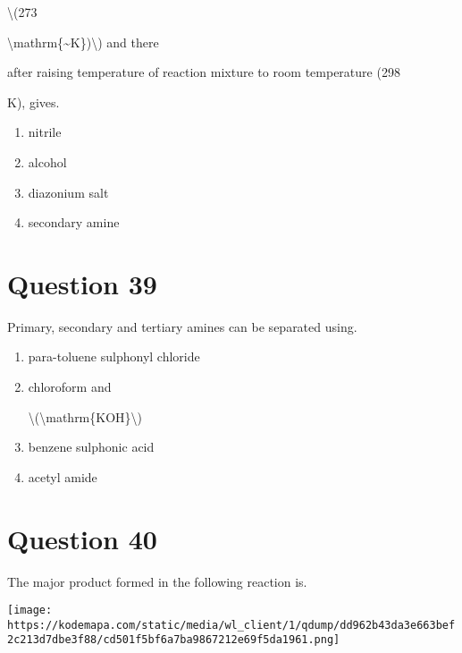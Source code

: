 \documentclass{article}
\begin{document}
\textbackslash(273

\textbackslash mathrm\{\textasciitilde K\})\textbackslash) and there

after raising temperature of reaction mixture to room temperature (298

K), gives.


\begin{enumerate}[label=(\alph*)]
\item nitrile


\item alcohol


\item diazonium salt


\item secondary amine


\end{enumerate}
\newpage
\section*{Question 39}
Primary, secondary and tertiary amines can be separated using.


\begin{enumerate}[label=(\alph*)]
\item para-toluene sulphonyl chloride


\item chloroform and

\textbackslash(\textbackslash mathrm\{KOH\}\textbackslash)


\item benzene sulphonic acid


\item acetyl amide


\end{enumerate}
\newpage
\section*{Question 40}
The major product formed in the following reaction is.



\texttt{[image: https://kodemapa.com/static/media/wl\_client/1/qdump/dd962b43da3e663bef2c213d7dbe3f88/cd501f5bf6a7ba9867212e69f5da1961.png]}\\
\end{document}

